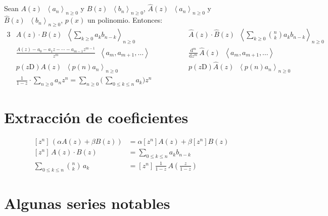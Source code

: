 \documentclass[fleqn, spanish]{article}
\DeclareMathOperator{\ogf}{\stackrel{\text{ogf}}{\longleftrightarrow}}
\DeclareMathOperator{\egf}{\stackrel{\text{egf}}{\longleftrightarrow}}
\begin{document}
  Sean
  \(A(z)
      \ogf \left\langle a_n \right\rangle_{n \ge 0}\) y
  \(B(z)
      \ogf \left\langle b_n \right\rangle_{n \ge 0}\),
  \(\widehat{A}(z)
      \egf \left\langle a_n \right\rangle_{n \ge 0}\) y
  \(\widehat{B}(z)
      \egf \left\langle b_n \right\rangle_{n \ge 0}\),
  \(p(x)\) un polinomio.
  Entonces:
  \begin{alignat*}{3}
    &A(z) \cdot B(z)
      \ogf
	 \left\langle
	   \sum_{k \ge 0} a_k b_{n - k}
	 \right\rangle_{n \ge 0} &&\qquad&
    &\widehat{A}(z) \cdot \widehat{B}(z)
      \egf
	 \left\langle
	   \sum_{k \ge 0} \binom{n}{k} a_k b_{n - k}
	 \right\rangle_{n \ge 0} \\
    &\frac{A(z) - a_0 - a_1 z - \dotsb - a_{m - 1} z^{m - 1}}{z^m}
      \ogf
	 \left\langle a_m, a_{m + 1}, \dotsc \right\rangle &&\qquad&
    &\frac{\mathrm{d}^m}{\mathrm{d} z^m} \, \widehat{A}(z)
      \egf
	 \left\langle a_m, a_{m + 1}, \dotsc \right\rangle \\
    &p(z \mathrm{D}) A(z)
      \ogf \left\langle p(n) a_n \right\rangle_{n \ge 0} &&\qquad&
    &p(z \mathrm{D}) \widehat{A}(z)
      \egf \left\langle p(n) a_n \right\rangle_{n \ge 0} \\
    &\frac{1}{1 - z} \cdot \sum_{n \ge 0} a_n z^n
      = \sum_{n \ge 0}
	  \biggl( \,
	    \sum_{0 \le k \le n} a_k
	  \biggr) z^n
  \end{alignat*}

\section*{Extracción de coeficientes}
\label{sec:coefficient-extraction}

  \begin{align*}
    \left[ z^n \right] \, (\alpha A(z) + \beta B(z))
      &= \alpha \left[ z^n \right] A(z) + \beta \left[ z^n \right] B(z) \\
    \left[ z^n \right] \, A(z) \cdot B(z)
      &= \sum_{0 \le k \le n} a_k b_{n - k} \\
    \sum_{0 \le k \le n} \binom{n}{k} \, a_k
      &= \left[ z^n \right] \,
	   \frac{1}{1 - z} \,
	     A \left(
		 \frac{z}{1 - z}
	       \right)
  \end{align*}

\section*{Algunas series notables}
\label{sec:series}
\end{document}
